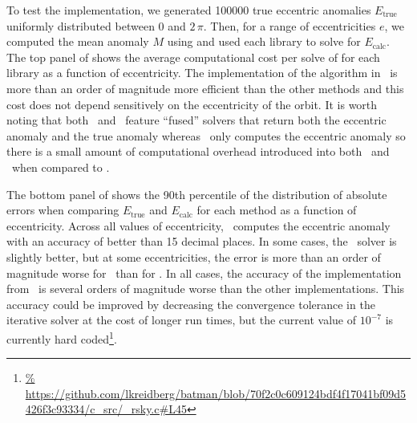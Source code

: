 \documentclass[modern]{aastex62}
\begin{document}
To test the implementation, we generated 100000 true eccentric anomalies
$E_\mathrm{true}$ uniformly distributed between $0$ and $2\,\pi$.
Then, for a range of eccentricities $e$, we computed the mean anomaly $M$ using
 and used each library to solve  for
$E_\mathrm{calc}$.
The top panel of  shows the average computational cost per
solve of  for each library as a function of eccentricity.
The implementation of the \citet{Nijenhuis:1991} algorithm in \exoplanet\ is
more than an order of magnitude more efficient than the other methods and this
cost does not depend sensitively on the eccentricity of the orbit.
It is worth noting that both \batman\ and \exoplanet\ feature ``fused''
solvers that return both the eccentric anomaly and the true anomaly whereas
\radvel\ only computes the eccentric anomaly so there is a small amount of
computational overhead introduced into both \exoplanet\ and \batman\ when
compared to \radvel.

The bottom panel of  shows the 90th percentile of the
distribution of absolute errors when comparing $E_\mathrm{true}$ and
$E_\mathrm{calc}$ for each method as a function of eccentricity.
Across all values of eccentricity, \exoplanet\ computes the eccentric anomaly
with an accuracy of better than 15 decimal places.
In some cases, the \radvel\ solver is slightly better, but at some
eccentricities, the error is more than an order of magnitude worse for
\radvel\ than for \exoplanet.
In all cases, the accuracy of the implementation from \batman\ is several
orders of magnitude worse than the other implementations.
This accuracy could be improved by decreasing the convergence tolerance in the
iterative solver at the cost of longer run times, but the current value of
$10^{-7}$ is currently hard coded\footnote{\url{%
https://github.com/lkreidberg/batman/blob/70f2c0c609124bdf4f17041bf09d5426f3c93334/c\_src/\_rsky.c\#L45}}.
\end{document}
